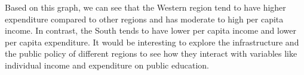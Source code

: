 \documentclass[12pt,letterpaper]{article}
\begin{document}
\begin{itemize}


\noindent Based on this graph, we can see that the Western region tend to have higher expenditure compared to other regions and has moderate to high per capita income. In contrast, the South tends to have lower per capita income and lower per capita expenditure. It would be interesting to explore the infrastructure and the public policy of different regions to see how they interact with variables like individual income and expenditure on public education.

\end{itemize}
\end{document}
